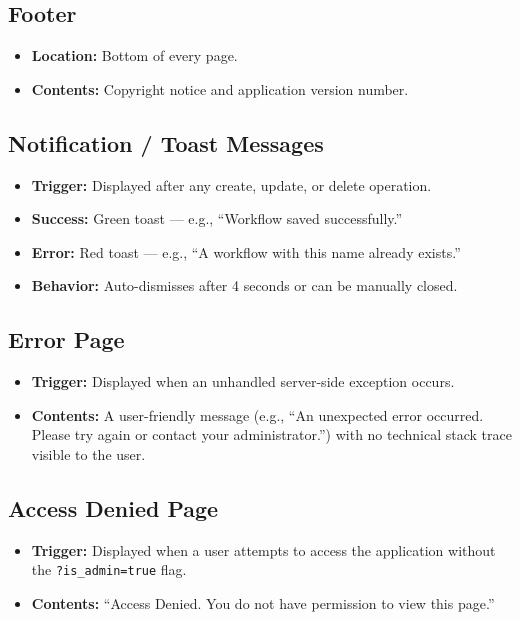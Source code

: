 \documentclass[12pt]{article}
\begin{document}
\subsection{Footer}
\begin{itemize}
    \item \textbf{Location:} Bottom of every page.
    \item \textbf{Contents:} Copyright notice and application version number.
\end{itemize}

\subsection{Notification / Toast Messages}
\begin{itemize}
    \item \textbf{Trigger:} Displayed after any create, update, or delete operation.
    \item \textbf{Success:} Green toast — e.g., ``Workflow saved successfully.''
    \item \textbf{Error:} Red toast — e.g., ``A workflow with this name already exists.''
    \item \textbf{Behavior:} Auto-dismisses after 4 seconds or can be manually closed.
\end{itemize}

\subsection{Error Page}
\begin{itemize}
    \item \textbf{Trigger:} Displayed when an unhandled server-side exception occurs.
    \item \textbf{Contents:} A user-friendly message (e.g., ``An unexpected error occurred.
    Please try again or contact your administrator.'') with no technical stack trace visible
    to the user.
\end{itemize}

\subsection{Access Denied Page}
\begin{itemize}
    \item \textbf{Trigger:} Displayed when a user attempts to access the application without
    the \texttt{?is\_admin=true} flag.
    \item \textbf{Contents:} ``Access Denied. You do not have permission to view this page.''
\end{itemize}
\end{document}

